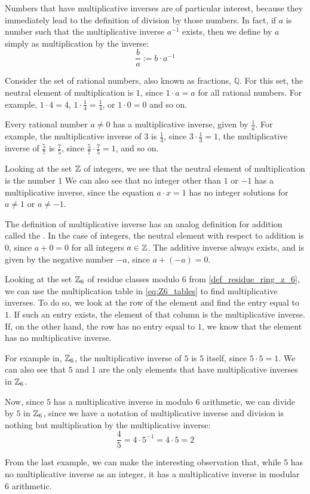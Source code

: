 Numbers that have multiplicative inverses are of particular interest, because they immediately lead to the definition of division by those numbers. In fact, if $a$ is number such that the multiplicative inverse $a^{-1}$ exists, then we define  by $a$ simply as multiplication by the inverse:
\begin{equation}
\frac{b}{a}:= b\cdot a^{-1}
\end{equation}
\begin{example} Consider the set of rational numbers, also known as fractions, $\mathbb{Q}$. For this set, the neutral element of multiplication is $1$, since $1\cdot a = a$ for all rational numbers. For example, $1\cdot 4=4$, $1\cdot \frac{1}{4}=\frac{1}{4}$, or $1\cdot 0 =0$ and so on.

Every rational number $a\neq 0$ has a multiplicative inverse, given by $\frac{1}{a}$.
For example, the multiplicative inverse of $3$ is $\frac{1}{3}$, since $3\cdot \frac{1}{3}=1$, the multiplicative inverse of $\frac{5}{7}$ is $\frac{7}{5}$, since $\frac{5}{7}\cdot \frac{7}{5}=1$, and so on.
\end{example}
\begin{example}Looking at  the set $\mathbb{Z}$ of integers, we see that the neutral element of multiplication is the number $1$ We can also see that no integer other than $1$ or $-1$ has a multiplicative inverse, since the equation $a\cdot x =1$ has no integer solutions for $a\neq 1$ or $a\neq -1$.

The definition of multiplicative inverse has an analog definition for addition called the . In the case of integers, the neutral element with respect to addition is $0$, since $a+0=0$ for all integers $a\in\mathbb{Z}$. The additive inverse always exists, and is given by the negative number $-a$, since $a+(-a)=0$.
\end{example}
\begin{example} Looking at the set $\mathbb{Z}_6$ of residue classes modulo $6$ from \examplename{} \ref{def_residue_ring_z_6}, we can use the multiplication table in \eqref{eq:Z6_tables} to find multiplicative inverses. To do so, we look at the row of the element and find the entry equal to $1$. If such an entry exists, the element of that column is the multiplicative inverse. If, on the other hand, the row has no entry equal to $1$, we know that the element has no multiplicative inverse.

For example in, $\mathbb{Z}_6$, the multiplicative inverse of $5$ is $5$ itself, since $5\cdot 5=1$. We can also see that $5$ and $1$ are the only elements that have multiplicative inverses in $\mathbb{Z}_6$.

Now, since $5$ has a multiplicative inverse in modulo $6$ arithmetic, we can divide by $5$ in $\mathbb{Z}_6$, since we have a notation of multiplicative inverse and division is nothing but multiplication by the multiplicative inverse:
$$
\frac{4}{5}= 4\cdot 5^{-1} = 4\cdot 5 = 2
$$
\end{example}
From the last example, we can make the interesting observation that, while $5$ has no multiplicative inverse as an integer, it has a multiplicative inverse in modular $6$ arithmetic.


